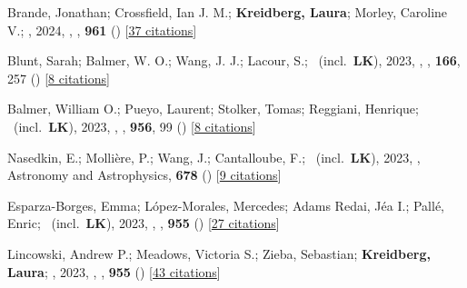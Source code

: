 \item[{\color{numcolor}\scriptsize99}] Brande, Jonathan; Crossfield, Ian J. M.; \textbf{Kreidberg, Laura}; Morley, Caroline V.; \etal, 2024, , \apj, \textbf{961} () [\href{https://ui.adsabs.harvard.edu/abs/2024ApJ...961L..23B}{37 citations}]

\item[{\color{numcolor}\scriptsize98}] Blunt, Sarah; Balmer, W. O.; Wang, J. J.; Lacour, S.; \etal\ (incl.\ \textbf{LK}), 2023, , \aj, \textbf{166}, 257 () [\href{https://ui.adsabs.harvard.edu/abs/2023AJ....166..257B}{8 citations}]

\item[{\color{numcolor}\scriptsize97}] Balmer, William O.; Pueyo, Laurent; Stolker, Tomas; Reggiani, Henrique; \etal\ (incl.\ \textbf{LK}), 2023, , \apj, \textbf{956}, 99 () [\href{https://ui.adsabs.harvard.edu/abs/2023ApJ...956...99B}{8 citations}]

\item[{\color{numcolor}\scriptsize96}] Nasedkin, E.; Molli{\`e}re, P.; Wang, J.; Cantalloube, F.; \etal\ (incl.\ \textbf{LK}), 2023, , Astronomy and Astrophysics, \textbf{678} () [\href{https://ui.adsabs.harvard.edu/abs/2023A&A...678A..41N}{9 citations}]

\item[{\color{numcolor}\scriptsize95}] Esparza-Borges, Emma; L{\'o}pez-Morales, Mercedes; Adams Redai, J{\'e}a I.; Pall{\'e}, Enric; \etal\ (incl.\ \textbf{LK}), 2023, , \apj, \textbf{955} () [\href{https://ui.adsabs.harvard.edu/abs/2023ApJ...955L..19E}{27 citations}]

\item[{\color{numcolor}\scriptsize94}] Lincowski, Andrew P.; Meadows, Victoria S.; Zieba, Sebastian; \textbf{Kreidberg, Laura}; \etal, 2023, , \apj, \textbf{955} () [\href{https://ui.adsabs.harvard.edu/abs/2023ApJ...955L...7L}{43 citations}]

